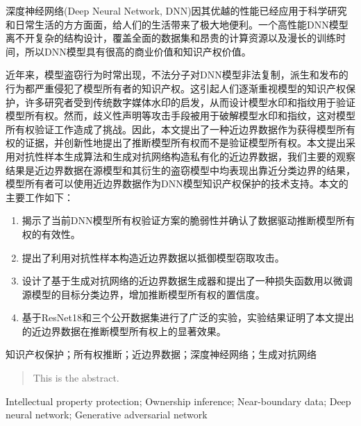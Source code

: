 

\begin{zhaiyao}

深度神经网络(Deep Neural Network, DNN)因其优越的性能已经应用于科学研究和日常生活的方方面面，给人们的生活带来了极大地便利。一个高性能DNN模型离不开复杂的结构设计，覆盖全面的数据集和昂贵的计算资源以及漫长的训练时间，所以DNN模型具有很高的商业价值和知识产权价值。

近年来，模型盗窃行为时常出现，不法分子对DNN模型非法复制，派生和发布的行为都严重侵犯了模型所有者的知识产权。这引起人们逐渐重视模型的知识产权保护，许多研究者受到传统数字媒体水印的启发，从而设计模型水印和指纹用于验证模型所有权。然而，歧义性声明等攻击手段被用于破解模型水印和指纹，这对模型所有权验证工作造成了挑战。因此，本文提出了一种近边界数据作为获得模型所有权的证据，并创新性地提出了推断模型所有权而不是验证模型所有权。本文提出采用对抗性样本生成算法和生成对抗网络构造私有化的近边界数据，我们主要的观察结果是近边界数据在源模型和其衍生的盗窃模型中均表现出靠近分类边界的结果，模型所有者可以使用近边界数据作为DNN模型知识产权保护的技术支持。本文的主要工作如下：

\begin{enumerate}
	\renewcommand{\labelenumi}{\theenumi)}
	\item 揭示了当前DNN模型所有权验证方案的脆弱性并确认了数据驱动推断模型所有权的有效性。
	\item 提出了利用对抗性样本构造近边界数据以抵御模型窃取攻击。
	\item 设计了基于生成对抗网络的近边界数据生成器和提出了一种损失函数用以微调源模型的目标分类边界，增加推断模型所有权的置信度。
	\item 基于ResNet18和三个公开数据集进行了广泛的实验，实验结果证明了本文提出的近边界数据在推断模型所有权上的显著效果。
\end{enumerate}



\end{zhaiyao}




\begin{guanjianci}
知识产权保护；所有权推断；近边界数据；深度神经网络；生成对抗网络
\end{guanjianci}



\begin{abstract}


This is the abstract.

\end{abstract}



\begin{keywords}
Intellectual property protection; Ownership inference; Near-boundary data; Deep neural network; Generative adversarial network
\end{keywords} 